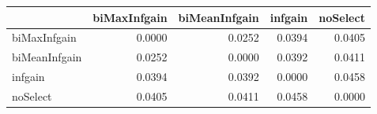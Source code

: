 \begin{tabular}{lrrrr}
\toprule
 & biMaxInfgain & biMeanInfgain & infgain & noSelect \\
\midrule
biMaxInfgain & 0.0000 & 0.0252 & 0.0394 & 0.0405 \\
biMeanInfgain & 0.0252 & 0.0000 & 0.0392 & 0.0411 \\
infgain & 0.0394 & 0.0392 & 0.0000 & 0.0458 \\
noSelect & 0.0405 & 0.0411 & 0.0458 & 0.0000 \\
\bottomrule
\end{tabular}
